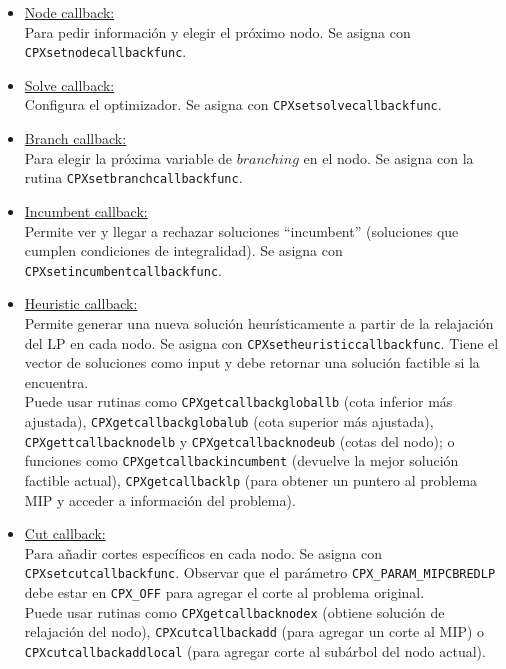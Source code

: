 \begin{itemize}
\item \underline{Node callback:}\\
Para pedir información y elegir el próximo nodo. Se asigna con \verb_CPXsetnodecallbackfunc_.

\item \underline{Solve callback:}\\
Configura el optimizador. Se asigna con \verb_CPXsetsolvecallbackfunc_.

\item \underline{Branch callback:}\\
Para elegir la próxima variable de $branching$ en el nodo. Se asigna con la rutina \verb_CPXsetbranchcallbackfunc_.

\item \underline{Incumbent callback:}\\
Permite ver y llegar a rechazar soluciones ``incumbent'' (soluciones que cumplen condiciones de integralidad). Se asigna con \verb_CPXsetincumbentcallbackfunc_.

\item \underline{Heuristic callback:}\\
Permite generar una nueva solución heurísticamente a partir de la relajación del LP en cada nodo. Se asigna con \verb_CPXsetheuristiccallbackfunc_. Tiene el vector de soluciones como input y debe retornar una solución factible si la encuentra.\\
Puede usar rutinas como \verb_CPXgetcallbackgloballb_ (cota inferior más ajustada), \verb_CPXgetcallbackglobalub_ (cota superior más ajustada), \verb_CPXgettcallbacknodelb_ y \verb_CPXgetcallbacknodeub_ (cotas del nodo); o funciones como \verb_CPXgetcallbackincumbent_ (devuelve la mejor solución factible actual), \verb_CPXgetcallbacklp_ (para obtener un puntero al problema MIP y acceder a información del problema).

\item \underline{Cut callback:}\\
Para añadir cortes específicos en cada nodo. Se asigna con \verb_CPXsetcutcallbackfunc_. Observar que el parámetro \verb'CPX_PARAM_MIPCBREDLP' debe estar en \verb"CPX_OFF" para agregar el corte al problema original.\\
Puede usar rutinas como \verb_CPXgetcallbacknodex_ (obtiene solución de relajación del nodo), \verb_CPXcutcallbackadd_ (para agregar un corte al MIP) o \verb_CPXcutcallbackaddlocal_ (para agregar corte al subárbol del nodo actual).
\end{itemize}
